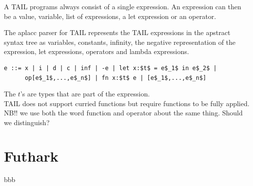 \documentclass[11pt]{article}
\begin{document}
A TAIL programs always consist of a single expression. An expression can then be a value, variable, 
list of expressions, a let expression or an operator.

The aplacc parser for TAIL represents the TAIL expressions in the apstract syntax tree as variables, constants, infinity, the negative representation of 
the expression, let expressions, operators and lambda expressions. 
\begin{lstlisting}[numbers=none,frame=none]
e ::= x | i | d | c | inf | -e | let x:$t$ = e$_1$ in e$_2$ |
      op[e$_1$,...,e$_n$] | fn x:$t$ e | [e$_1$,...,e$_n$]
\end{lstlisting}

The $t$'s are types that are part of the expression. \\

TAIL does not support curried functions but require functions to be fully applied.\\

NB!! we use both the word function and operator about the same thing. Should we distinguish?








 


\section{Futhark}
bbb
{}

\end{document}
